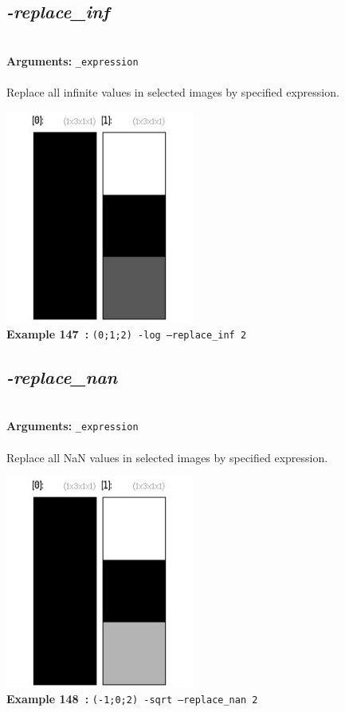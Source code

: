 \documentclass[a4paper,11pt,twoside]{book}
\begin{document}
\subsection{\emph{-replace\_inf} }\vspace*{-0.5em}
~\\\textbf{Arguments: } 
{\small \texttt{\_expression}}\\~\\
Replace all infinite values in selected images by specified expression.
\begin{center}\includegraphics[keepaspectratio=true,height=7cm,width=\textwidth]{img/gmic_def147.jpg}\\
{\footnotesize \textbf{Example 147~:} \texttt{(0;1;2) -log --replace\_inf 2}}
\end{center}

\subsection{\emph{-replace\_nan} }\vspace*{-0.5em}
~\\\textbf{Arguments: } 
{\small \texttt{\_expression}}\\~\\
Replace all NaN values in selected images by specified expression.
\begin{center}\includegraphics[keepaspectratio=true,height=7cm,width=\textwidth]{img/gmic_def148.jpg}\\
{\footnotesize \textbf{Example 148~:} \texttt{(-1;0;2) -sqrt --replace\_nan 2}}
\end{center}
\end{document}
